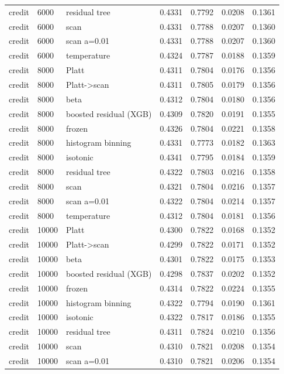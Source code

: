 \begin{tabular}{lllrrrr}
credit & 6000 & residual tree & 0.4331 & 0.7792 & 0.0208 & 0.1361 \\
credit & 6000 & scan & 0.4331 & 0.7788 & 0.0207 & 0.1360 \\
credit & 6000 & scan a=0.01 & 0.4331 & 0.7788 & 0.0207 & 0.1360 \\
credit & 6000 & temperature & 0.4324 & 0.7787 & 0.0188 & 0.1359 \\
credit & 8000 & Platt & 0.4311 & 0.7804 & 0.0176 & 0.1356 \\
credit & 8000 & Platt->scan & 0.4311 & 0.7805 & 0.0179 & 0.1356 \\
credit & 8000 & beta & 0.4312 & 0.7804 & 0.0180 & 0.1356 \\
credit & 8000 & boosted residual (XGB) & 0.4309 & 0.7820 & 0.0191 & 0.1355 \\
credit & 8000 & frozen & 0.4326 & 0.7804 & 0.0221 & 0.1358 \\
credit & 8000 & histogram binning & 0.4331 & 0.7773 & 0.0182 & 0.1363 \\
credit & 8000 & isotonic & 0.4341 & 0.7795 & 0.0184 & 0.1359 \\
credit & 8000 & residual tree & 0.4322 & 0.7803 & 0.0216 & 0.1358 \\
credit & 8000 & scan & 0.4321 & 0.7804 & 0.0216 & 0.1357 \\
credit & 8000 & scan a=0.01 & 0.4322 & 0.7804 & 0.0214 & 0.1357 \\
credit & 8000 & temperature & 0.4312 & 0.7804 & 0.0181 & 0.1356 \\
credit & 10000 & Platt & 0.4300 & 0.7822 & 0.0168 & 0.1352 \\
credit & 10000 & Platt->scan & 0.4299 & 0.7822 & 0.0171 & 0.1352 \\
credit & 10000 & beta & 0.4301 & 0.7822 & 0.0175 & 0.1353 \\
credit & 10000 & boosted residual (XGB) & 0.4298 & 0.7837 & 0.0202 & 0.1352 \\
credit & 10000 & frozen & 0.4314 & 0.7822 & 0.0224 & 0.1355 \\
credit & 10000 & histogram binning & 0.4322 & 0.7794 & 0.0190 & 0.1361 \\
credit & 10000 & isotonic & 0.4322 & 0.7817 & 0.0186 & 0.1355 \\
credit & 10000 & residual tree & 0.4311 & 0.7824 & 0.0210 & 0.1356 \\
credit & 10000 & scan & 0.4310 & 0.7821 & 0.0208 & 0.1354 \\
credit & 10000 & scan a=0.01 & 0.4310 & 0.7821 & 0.0206 & 0.1354 \\

\end{tabular}
